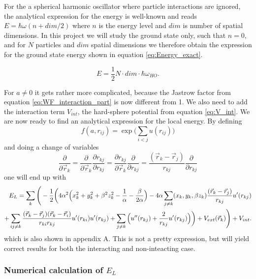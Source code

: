 \documentclass[norsk,a4paper,12pt]{article}
\begin{document}
For the a spherical harmonic oscillator where particle interactions are ignored, the analytical expression for the energy is well-known and reads $E = \hbar\omega(n + dim/2)$ where $n$ is the energy level and $dim$ is number of spatial dimensions. In this project we will study the ground state only, such that $n=0$, and for $N$ particles and $dim$ spatial dimensions we therefore obtain the expression for the ground state energy shown in equation \ref{eq:Energy_exact}.

\begin{equation}
E = \frac{1}{2}N\cdot dim\cdot\hbar\omega_{HO}.
\label{eq:Energy_exact}
\end{equation}


For $a\neq0$ it gets rather more complicated, because the Jastrow factor from equation \ref{eq:WF_interaction_part} is now different from 1. We also need to add the interaction term $V_{int}$, the hard-sphere potential from equation \ref{eq:V_int}. We are now ready to find an analytical expression for the local energy. By defining
\begin{equation}
f(a, r_{ij})=\exp{\bigg(\sum_{i<j}u(r_{ij})\bigg)}
\end{equation}
and doing a change of variables
\begin{equation}
\frac{\partial}{\partial \vec{r}_k}=\frac{\partial}{\partial \vec{r}_k}\frac{\partial r_{kj}}{\partial r_{kj}}=\frac{\partial r_{kj}}{\partial \vec{r}_k}\frac{\partial}{\partial r_{kj}}=\frac{(\vec{r}_k-\vec{r}_j)}{r_{kj}}\frac{\partial}{\partial r_{kj}}
\end{equation}
one will end up with
\begin{align}
E_L=\sum_k\Bigg(-\frac{1}{2}\bigg(4\alpha^2\Big(x_k^2+y_k^2+\beta^2z_k^2-\frac{1}{\alpha}-\frac{\beta}{2\alpha}\Big)
-4\alpha\sum_{j\neq k}(x_k, y_k, \beta z_k)\frac{(\vec{r}_k-\vec{r}_j)}{r_{kj}}u'(r_{kj})\notag\\
+\sum_{ij\neq k}\frac{(\vec{r}_k-\vec{r}_j)(\vec{r}_k-\vec{r}_i)}{r_{ki}r_{kj}}u'(r_{ki})u'(r_{kj})
+\sum_{j\neq k}\Big(u''(r_{kj})+\frac{2}{r_{kj}}u'(r_{kj})\Big)\bigg)+V_{ext}(\vec{r}_k)\Bigg) + V_{int}.\notag
\label{EL_total}
\end{align}
which is also shown in appendix A. This is not a pretty expression, but will yield correct results for both the interacting and non-inteacting case.



\subsubsection{Numerical calculation of $E_L$} \label{Numerical_calc_E_L}
\end{document}

